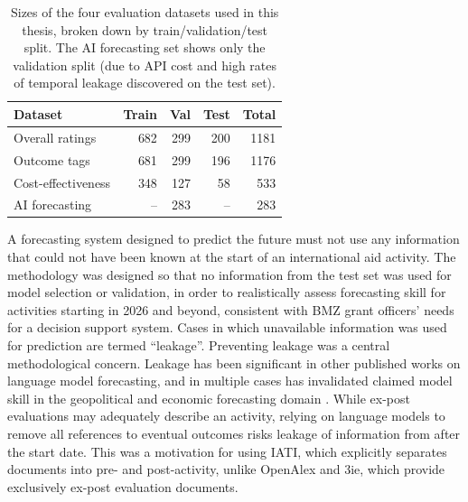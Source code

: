 \documentclass[12pt,a4paper]{article}
\let\citep\parencite
\begin{document}
\begin{table}[t]
\centering
\small
\caption{Sizes of the four evaluation datasets used in this thesis, broken down by train/validation/test split. The AI forecasting set shows only the validation split (due to API cost and high rates of temporal leakage discovered on the test set).}
\label{tab:eval_set_sizes}
\begin{tabular}{lrrrr}
\toprule
Dataset & Train & Val & Test & Total \\
\midrule
Overall ratings & 682 & 299 & 200 & 1181 \\
Outcome tags & 681 & 299 & 196 & 1176 \\
Cost-effectiveness & 348 & 127 & 58 & 533 \\
AI forecasting & -- & 283 & -- & 283 \\
\bottomrule
\end{tabular}
\end{table}



A forecasting system designed to predict the future must not use any information that could not have been known at the start of an international aid activity. The methodology was designed so that no information from the test set was used for model selection or validation, in order to realistically assess forecasting skill for activities starting in 2026 and beyond, consistent with BMZ grant officers' needs for a decision support system. Cases in which unavailable information was used for prediction are termed ``leakage''. Preventing leakage was a central methodological concern. Leakage has been significant in other published works on language model forecasting, and in multiple cases has invalidated claimed model skill in the geopolitical and economic forecasting domain \citep{palekaPitfallsEvaluatingLanguage2025}. While ex-post evaluations may adequately describe an activity, relying on language models to remove all references to eventual outcomes risks leakage of information from after the start date. This was a motivation for using IATI, which explicitly separates documents into pre- and post-activity, unlike OpenAlex and 3ie, which provide exclusively ex-post evaluation documents.
\end{document}
